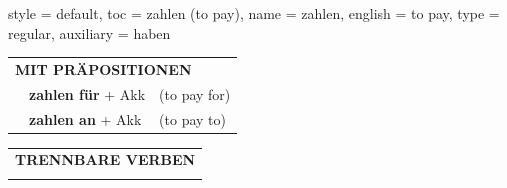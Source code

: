 \begin{verbentry}{
  style = {default},
  toc = {zahlen (to pay)},
  name = {zahlen},
  english = {to pay},
  type = {regular},
  auxiliary = {haben}
}
\vspace{10pt}

\begin{tabular}{lll}
\multicolumn{3}{l}{\textbf{MIT PRÄPOSITIONEN}}\\
& \textbf{zahlen für} + Akk & (to pay for)\\
& \textbf{zahlen an} + Akk & (to pay to)\\
\end{tabular}
\hfill
\begin{tabular}{lll}
\multicolumn{3}{l}{\textbf{TRENNBARE VERBEN}}\\
\vspace{20pt}
\end{tabular}
\vspace{-5pt}
\end{verbentry}

